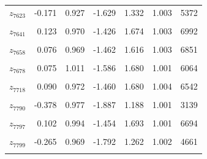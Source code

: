 \begin{longtable}{lrrrrrr}
$z_{7623}$ & -0.171 & 0.927 & -1.629 & 1.332 & 1.003 & 5372\\
\cellcolor{gray!10}{$z_{7635}$} & \cellcolor{gray!10}{0.064} & \cellcolor{gray!10}{0.999} & \cellcolor{gray!10}{-1.506} & \cellcolor{gray!10}{1.688} & \cellcolor{gray!10}{1.005} & \cellcolor{gray!10}{6375}\\
$z_{7641}$ & 0.123 & 0.970 & -1.426 & 1.674 & 1.003 & 6992\\
\cellcolor{gray!10}{$z_{7646}$} & \cellcolor{gray!10}{0.049} & \cellcolor{gray!10}{0.962} & \cellcolor{gray!10}{-1.490} & \cellcolor{gray!10}{1.585} & \cellcolor{gray!10}{1.003} & \cellcolor{gray!10}{5259}\\
$z_{7658}$ & 0.076 & 0.969 & -1.462 & 1.616 & 1.003 & 6851\\
\cellcolor{gray!10}{$z_{7671}$} & \cellcolor{gray!10}{0.067} & \cellcolor{gray!10}{0.977} & \cellcolor{gray!10}{-1.468} & \cellcolor{gray!10}{1.675} & \cellcolor{gray!10}{1.001} & \cellcolor{gray!10}{7078}\\
$z_{7678}$ & 0.075 & 1.011 & -1.586 & 1.680 & 1.001 & 6064\\
\cellcolor{gray!10}{$z_{7691}$} & \cellcolor{gray!10}{0.084} & \cellcolor{gray!10}{0.976} & \cellcolor{gray!10}{-1.468} & \cellcolor{gray!10}{1.668} & \cellcolor{gray!10}{1.006} & \cellcolor{gray!10}{5733}\\
$z_{7718}$ & 0.090 & 0.972 & -1.460 & 1.680 & 1.004 & 6542\\
\cellcolor{gray!10}{$z_{7732}$} & \cellcolor{gray!10}{0.071} & \cellcolor{gray!10}{0.995} & \cellcolor{gray!10}{-1.511} & \cellcolor{gray!10}{1.642} & \cellcolor{gray!10}{1.000} & \cellcolor{gray!10}{5085}\\
$z_{7790}$ & -0.378 & 0.977 & -1.887 & 1.188 & 1.001 & 3139\\
\cellcolor{gray!10}{$z_{7796}$} & \cellcolor{gray!10}{0.100} & \cellcolor{gray!10}{0.991} & \cellcolor{gray!10}{-1.481} & \cellcolor{gray!10}{1.674} & \cellcolor{gray!10}{1.001} & \cellcolor{gray!10}{5611}\\
$z_{7797}$ & 0.102 & 0.994 & -1.454 & 1.693 & 1.001 & 6694\\
\cellcolor{gray!10}{$z_{7798}$} & \cellcolor{gray!10}{0.031} & \cellcolor{gray!10}{1.001} & \cellcolor{gray!10}{-1.539} & \cellcolor{gray!10}{1.609} & \cellcolor{gray!10}{1.001} & \cellcolor{gray!10}{5652}\\
$z_{7799}$ & -0.265 & 0.969 & -1.792 & 1.262 & 1.002 & 4661\\
\cellcolor{gray!10}{$z_{7800}$} & \cellcolor{gray!10}{-0.144} & \cellcolor{gray!10}{0.966} & \cellcolor{gray!10}{-1.703} & \cellcolor{gray!10}{1.398} & \cellcolor{gray!10}{1.002} & \cellcolor{gray!10}{6384}\\

\end{longtable}
